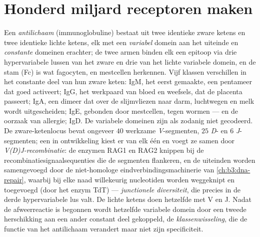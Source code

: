 \section{Honderd miljard receptoren maken}

\begin{definition}\label{def:b3:adaptive-immunity:antibody}
Een \emph{antilichaam} (immunoglobuline) bestaat uit twee identieke
zware ketens en twee identieke lichte ketens, elk met een
\emph{variabel} domein aan het uiteinde en \emph{constante} domeinen
erachter; de twee armen binden elk een epitoop via drie hypervariabele
lussen van het zware en drie van het lichte variabele domein, en de
stam (Fc) is wat fagocyten,  en mestcellen herkennen. Vijf
klassen verschillen in het constante deel van hun zware keten: IgM, het
eerst gemaakte, een pentameer dat  goed activeert; IgG, het
werkpaard van bloed en weefsels, dat de placenta passeert; IgA, een
dimeer dat over de slijmvliezen naar darm, luchtwegen en melk wordt
uitgescheiden; IgE, gebonden door mestcellen, tegen wormen --- en de
oorzaak van allergie; IgD. De variabele domeinen zijn als zodanig niet
gecodeerd. De zware-ketenlocus bevat ongeveer $40$ werkzame
\emph{V}-segmenten, $25$ \emph{D}- en $6$ \emph{J}-segmenten; een
 in ontwikkeling kiest er van elk één en voegt ze samen door
\emph{V(D)J-recombinatie}: de enzymen RAG1 en RAG2 knippen bij de
recombinatiesignaalsequenties die de segmenten flankeren, en de
uiteinden worden samengevoegd door de niet-homologe
eindverbindingsmachinerie van \cref{ch:b3:dna-repair}, waarbij bij elke
naad willekeurig nucleotiden worden weggeknipt en toegevoegd (door het
enzym TdT) --- \emph{junctionele diversiteit}, die precies in de derde
hypervariabele lus valt. De lichte ketens doen hetzelfde met V en J.
Nadat de afweerreactie is begonnen wordt hetzelfde variabele domein
door een tweede herschikking aan een ander constant deel gekoppeld, de
\emph{klassenwisseling}, die de functie van het antilichaam verandert
maar niet zijn specificiteit.
\end{definition}

